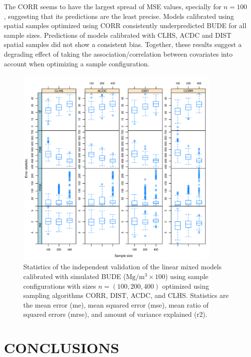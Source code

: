 The CORR seems to have the largest spread of MSE values, specially for $n = 100$, suggesting that its 
predictions are the least precise. Models calibrated using spatial samples optimized using CORR consistently 
underpredicted BUDE for all sample sizes. Predictions of models calibrated with CLHS, ACDC and DIST spatial 
samples did not show a consistent bias. Together, these results suggest a degrading effect of taking the 
association/correlation between covariates into account when optimizing a sample configuration.

\begin{figure}[!ht]
 \centering
 \includegraphics[width=0.90\textwidth]{fig/chap08-error-stats}
 \caption[Validation of linear mixed models calibrated using sample configurations optimized using four 
sampling algorithms.]{Statistics of the independent validation of the linear mixed models calibrated with 
simulated BUDE ($\si{\mega\gram\per\cubic\metre} \times 100$) using sample configurations with sizes $n = 
(100, 200, 400)$ optimized using sampling algorithms CORR, DIST,  ACDC, and CLHS. Statistics are the mean error 
(me), mean squared error (mse), mean ratio of squared errors (mrse), and amount of variance explained (r2).}
 \label{fig:chap08-validation}
\end{figure}

\section{CONCLUSIONS}

